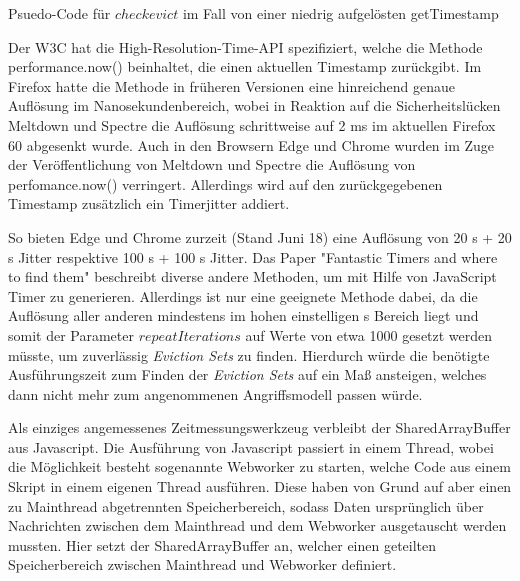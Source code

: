 \begin{algorithm}[h]
\DontPrintSemicolon
\caption{Psuedo-Code für $checkevict$ im Fall von einer niedrig aufgelösten getTimestamp}
\label{alg:checkevict_low_resolution}


\end{algorithm}

Der W3C hat die High-Resolution-Time-API spezifiziert, welche die Methode performance.now() beinhaltet, die einen aktuellen Timestamp zurückgibt. Im Firefox hatte die Methode in früheren Versionen eine hinreichend genaue Auflösung im Nanosekundenbereich, wobei in Reaktion auf die Sicherheitslücken Meltdown und Spectre die Auflösung schrittweise auf 2 ms im aktuellen Firefox 60 abgesenkt wurde. 
Auch in den Browsern Edge und Chrome wurden im Zuge der Veröffentlichung von Meltdown und Spectre die Auflösung von perfomance.now() verringert.
Allerdings wird auf den zurückgegebenen Timestamp zusätzlich ein Timerjitter addiert. 

So bieten Edge und Chrome zurzeit (Stand Juni 18) eine Auflösung von 20 \textmu s + 20 \textmu s Jitter respektive 100 \textmu s + 100 \textmu s Jitter.
Das Paper "Fantastic Timers and where to find them" \cite{FantasticTimers} beschreibt diverse andere Methoden, um mit Hilfe von JavaScript Timer zu generieren. 
Allerdings ist nur eine geeignete Methode dabei, da die Auflösung aller anderen mindestens im hohen einstelligen \textmu s Bereich liegt und somit der Parameter $repeatIterations$ auf Werte von etwa 1000 gesetzt werden müsste, um zuverlässig \textit{Eviction Sets} zu finden. 
Hierdurch würde die benötigte Ausführungszeit zum Finden der \textit{Eviction Sets} auf ein Maß ansteigen, welches dann nicht mehr zum angenommenen Angriffsmodell passen würde.

\newtext

Als einziges angemessenes Zeitmessungswerkzeug verbleibt der SharedArrayBuffer aus Javascript. 
Die Ausführung von Javascript passiert in einem Thread, wobei die Möglichkeit besteht sogenannte Webworker zu starten, welche Code aus einem Skript in einem eigenen Thread ausführen.
Diese haben von Grund auf aber einen zu Mainthread abgetrennten Speicherbereich, sodass Daten ursprünglich über Nachrichten zwischen dem Mainthread und dem Webworker ausgetauscht werden mussten. Hier setzt der SharedArrayBuffer an, welcher einen geteilten Speicherbereich zwischen Mainthread und Webworker definiert.

